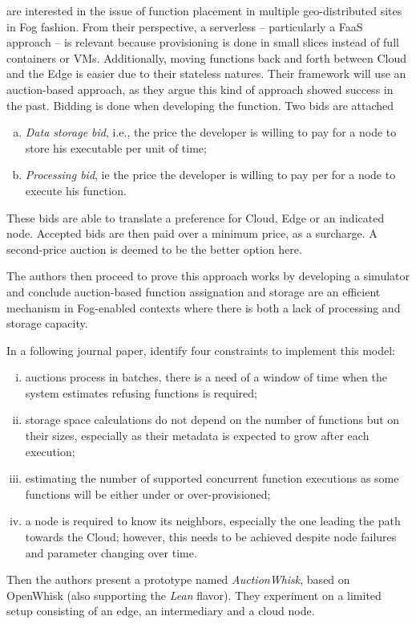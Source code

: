 \documentclass[11pt]{sdm}
\begin{document}
\begin{description}[leftmargin=10pt]
	\item[\citet{bermbach_towards_2020}] are interested in the issue of function placement in multiple geo-distributed sites in Fog fashion. From their perspective, a serverless -- particularly a \gls{FaaS} approach -- is relevant because provisioning is done in small slices instead of full containers or \glspl{VM}. Additionally, moving functions back and forth between Cloud and the Edge is easier due to their stateless natures. Their framework will use an auction-based approach, as they argue this kind of approach showed success in the past.
		Bidding is done when developing the function. Two bids are attached
		\begin{enumerate}[(a)]
			\item \emph{Data storage bid}, i.e., the price the developer is willing to pay for a node to store his executable per unit of time;
			\item \emph{Processing bid}, ie the price the developer is willing to pay per for a node to execute his function.
		\end{enumerate}
		These bids are able to translate a preference for Cloud, Edge or an indicated node. Accepted bids are then paid over a minimum price, as a surcharge. A second-price auction is deemed to be the better option here.

		The authors then proceed to prove this approach works by developing a simulator and conclude auction-based function assignation and storage are an efficient mechanism in Fog-enabled contexts where there is both a lack of processing and storage capacity.

		In a following journal paper, \citet{bermbach_auctionwhisk_2021} identify four constraints to implement this model:
		\begin{enumerate}[(i)]
			\item auctions process in batches, there is a need of a window of time when the system estimates refusing functions is required;
			\item storage space calculations do not depend on the number of functions but on their sizes, especially as their metadata is expected to grow after each execution;
			\item estimating the number of supported concurrent function executions as some functions will be either under or over-provisioned;
			\item a node is required to know its neighbors, especially the one leading the path towards the Cloud; however, this needs to be achieved despite node failures and parameter changing over time.
		\end{enumerate}

		Then the authors present a prototype named \emph{AuctionWhisk}, based on OpenWhisk (also supporting the \emph{Lean} flavor). They experiment on a limited setup consisting of an edge, an intermediary and a cloud node.

\end{description}
\end{document}
